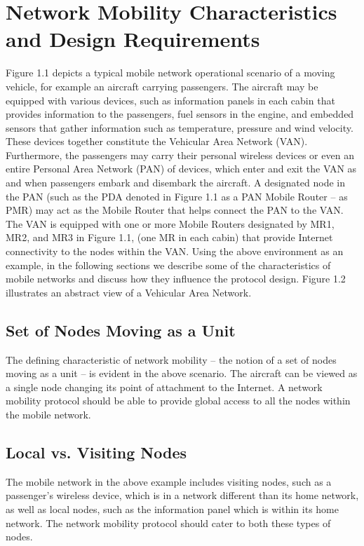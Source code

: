 \section{Network Mobility Characteristics and Design Requirements}

Figure 1.1 depicts a typical mobile network operational scenario of a moving
vehicle, for example an aircraft carrying passengers. The aircraft may be
equipped with various devices, such as information panels in each cabin that
provides information to the passengers, fuel sensors in the engine, and
embedded sensors that gather information such as temperature, pressure and
wind velocity. These devices together constitute the Vehicular Area Network
(VAN). Furthermore, the passengers may carry their personal wireless devices
or even an entire Personal Area Network (PAN) of devices, which enter and exit
the VAN as and when passengers embark and disembark the aircraft. A designated
node in the PAN (such as the PDA denoted in Figure 1.1 as a PAN Mobile Router --
as PMR) may act as the Mobile Router that helps connect the PAN to the VAN.
The VAN is equipped with one or more Mobile Routers designated by MR1, MR2,
and MR3 in Figure 1.1, (one MR in each cabin) that provide Internet connectivity
to the nodes within the VAN. Using the above environment as an example, in the
following sections we describe some of the characteristics of mobile networks
and discuss how they influence the protocol design. Figure 1.2 illustrates an
abstract view of a Vehicular Area Network.

\subsection{Set of Nodes Moving as a Unit}

The defining characteristic of network mobility -- the notion of a set of
nodes moving as a unit -- is evident in the above scenario. The aircraft can
be viewed as a single node changing its point of attachment to the Internet. A
network mobility protocol should be able to provide global access to all the
nodes within the mobile network.

\subsection{Local vs. Visiting Nodes}

The mobile network in the above example includes visiting nodes, such as a
passenger's wireless device, which is in a network different than its home
network, as well as local nodes, such as the information panel which is within
its home network. The network mobility protocol should cater to both these
types of nodes.

